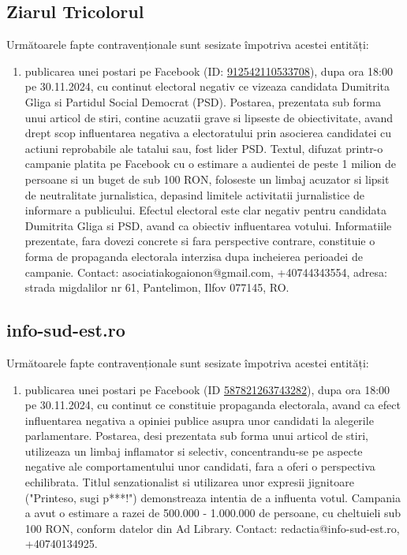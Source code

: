 \documentclass[a4paper,12pt]{article}
\begin{document}
\subsection{Ziarul Tricolorul}
Următoarele fapte contravenționale sunt sesizate împotriva acestei entități:

\begin{enumerate}[leftmargin=*, label=\arabic*.)]
    \item publicarea unei postari pe Facebook (ID: \href{https://www.facebook.com/ads/library/?id=912542110533708}{912542110533708}), dupa ora 18:00 pe 30.11.2024, cu continut electoral negativ ce vizeaza candidata Dumitrita Gliga si Partidul Social Democrat (PSD). Postarea, prezentata sub forma unui articol de stiri, contine acuzatii grave si lipseste de obiectivitate, avand drept scop influentarea negativa a electoratului prin asocierea candidatei cu actiuni reprobabile ale tatalui sau, fost lider PSD.  Textul, difuzat printr-o campanie platita pe Facebook cu o estimare a audientei de peste 1 milion de persoane si un buget de sub 100 RON,  foloseste un limbaj acuzator si lipsit de neutralitate jurnalistica, depasind limitele activitatii jurnalistice de informare a publicului.  Efectul electoral este clar negativ pentru candidata Dumitrita Gliga si PSD, avand ca obiectiv influentarea votului.  Informatiile prezentate, fara dovezi concrete si fara perspective contrare, constituie o forma de propaganda electorala interzisa dupa incheierea perioadei de campanie.  Contact: asociatiakogaionon@gmail.com, +40744343554, adresa: strada migdalilor nr 61, Pantelimon, Ilfov 077145, RO.
\end{enumerate}

\vspace{0.5cm}

\subsection{info-sud-est.ro}
Următoarele fapte contravenționale sunt sesizate împotriva acestei entități:

\begin{enumerate}[leftmargin=*, label=\arabic*.)]
    \item publicarea unei postari pe Facebook (ID \href{https://www.facebook.com/ads/library/?id=587821263743282}{587821263743282}), dupa ora 18:00 pe 30.11.2024, cu continut ce constituie propaganda electorala,  avand ca efect influentarea negativa a opiniei publice asupra unor candidati la alegerile parlamentare. Postarea, desi prezentata sub forma unui articol de stiri, utilizeaza un limbaj inflamator si selectiv, concentrandu-se pe aspecte negative ale comportamentului unor candidati, fara a oferi o perspectiva echilibrata. Titlul senzationalist si utilizarea unor expresii jignitoare ("Printeso, sugi p***!") demonstreaza intentia de a influenta votul.  Campania a avut o estimare a razei de 500.000 - 1.000.000 de persoane, cu cheltuieli sub 100 RON, conform datelor din Ad Library.  Contact: redactia@info-sud-est.ro, +40740134925.
\end{enumerate}
\end{document}
